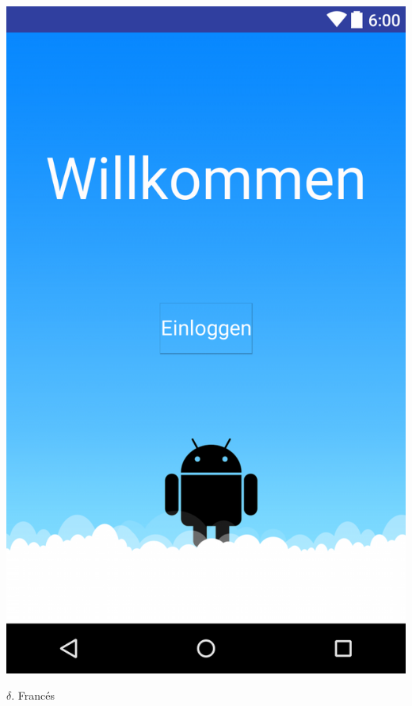 \documentclass{article}
\begin{document}
\begin{center}

\includegraphics[scale=.15]{layout-2016-04-17-Deu_lay.png} 

\end{center}

$\delta$. Franc\'es\
\end{document}
